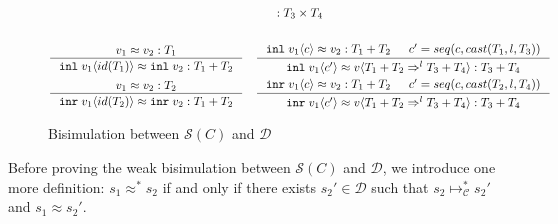 \documentclass[acmsmall,review,anonymous]{acmart}\settopmatter{printfolios=true,printccs=false,printacmref=false}
\newcommand{\plus}[0]{+}
\newcommand{\POOprod}[2]{#1 \times #2}
\newcommand{\POOsum}[2]{#1 \plus #2}
\newcommand{\cOOcast}[3]{#1 \Rightarrow^{#2} #3}
\newcommand{\vOOcast}[2]{#1\langle#2\rangle}
\newcommand{\vOOinl}[1]{\mathtt{inl}\;#1}
\newcommand{\vOOinr}[1]{\mathtt{inr}\;#1}
\newcommand{\hcvOOinl}[2]{\mathtt{inl}\;#1\langle#2\rangle}
\newcommand{\hcvOOinr}[2]{\mathtt{inr}\;#1\langle#2\rangle}
\newcommand{\judgeCreduceTrans}[2]{#1 \longmapsto_{\mathcal{C}}^{*} #2}
\newcommand{\ineffCEKD}{$\mathcal{D}$}
\newcommand{\effCEK}[1]{$\mathcal{S}(#1)$}
\begin{document}
\begin{figure}
\begin{gather}
{		: \POOprod{T_3}{T_4}
	}
\\ \\
	\inference{
		v_1 \approx v_2 : T_1
	}{
		\hcvOOinl{v_1}{id(T_1)} \approx \vOOinl{v_2}
		: \POOsum{T_1}{T_2}
	}
	\quad
	\inference{
		\hcvOOinl{v_1}{c} \approx v_2
		: \POOsum{T_1}{T_2} &
		c' = seq(c,cast(T_1,l,T_3))
	}{
		\hcvOOinl{v_1}{c'} \approx
		\vOOcast{v}{\cOOcast{\POOsum{T_1}{T_2}}{l}{\POOsum{T_3}{T_4}}}
		: \POOsum{T_3}{T_4}	
	}
	\\
	\inference{
	v_1 \approx v_2 : T_2
	}{
	\hcvOOinr{v_1}{id(T_2)} \approx \vOOinr{v_2}
	: \POOsum{T_1}{T_2}
	}
	\quad
	\inference{
	\hcvOOinr{v_1}{c} \approx v_2
	: \POOsum{T_1}{T_2} &
	c' = seq(c,cast(T_2,l,T_4))
	}{
	\hcvOOinr{v_1}{c'} \approx
	\vOOcast{v}{\cOOcast{\POOsum{T_1}{T_2}}{l}{\POOsum{T_3}{T_4}}}
	: \POOsum{T_3}{T_4}
	}
	\end{gather}
	\caption{Bisimulation between \effCEK{C} and \ineffCEKD}
	\label{fig:bisim-SC-D}
\end{figure}

Before proving the weak bisimulation between \effCEK{C} and \ineffCEKD, we 
introduce one more definition: $s_1 \approx^{*} s_2$ if and only if there 
exists $s_2' \in \text{\ineffCEKD}$
such that $\judgeCreduceTrans{s_2}{s_2'}$ and $s_1 \approx s_2'$.
\end{document}
